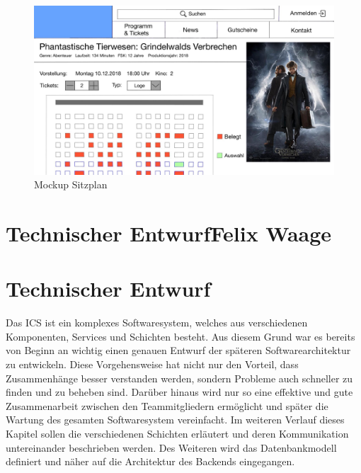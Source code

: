 		\begin{figure}[H]
			\centering 
			\includegraphics[width=14cm]{img/mockUp3.png}
			\captionsetup{format=hang}
			\caption[Mockup Sitzplan]{\label{fig:mockUpSitzplan} Mockup Sitzplan }
		\end{figure}
	
	\section[Technischer Entwurf]{Technischer Entwurf{\hfill \normalsize Felix Waage}} 	
	
		\section{Technischer Entwurf}
		Das \ac{ICS} ist ein komplexes Softwaresystem, welches aus verschiedenen Komponenten, Services und Schichten besteht. Aus diesem Grund war es bereits von Beginn an wichtig einen genauen Entwurf der späteren Softwarearchitektur zu entwickeln. Diese Vorgehensweise hat nicht nur den Vorteil, dass Zusammenhänge besser verstanden werden, sondern Probleme auch schneller zu finden und zu beheben sind. Darüber hinaus wird nur so eine effektive und gute Zusammenarbeit zwischen den Teammitgliedern ermöglicht und später die Wartung des gesamten Softwaresystem vereinfacht.
		Im weiteren Verlauf dieses Kapitel sollen die verschiedenen Schichten erläutert und deren Kommunikation untereinander beschrieben werden. Des Weiteren wird das Datenbankmodell definiert und näher auf die Architektur des Backends eingegangen.
		
